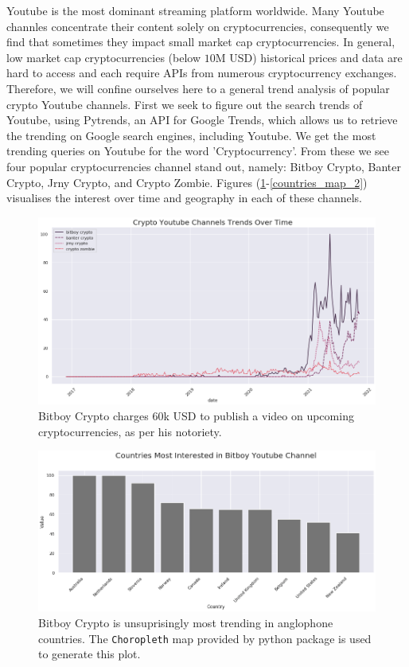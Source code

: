 \documentclass[twoside]{report}
\newcommand{\code}{\texttt}
\begin{document}
\begin{spacing}{1}
Youtube is the most dominant streaming platform worldwide. Many Youtube channles concentrate their content solely on cryptocurrencies, consequently we find that sometimes they impact small market cap cryptocurrencies. In general, low market cap cryptocurrencies (below $10
$M USD) historical prices and data are hard to access and each require APIs from numerous cryptocurrency exchanges. Therefore, we will confine ourselves here to a general trend analysis of popular crypto Youtube channels.
First we seek to figure out the search trends of Youtube, using Pytrends, an API for Google Trends, which allows us to retrieve the trending on Google search engines, including Youtube. We get the most trending queries on Youtube for the word 'Cryptocurrency'. From these we see four popular cryptocurrencies channel stand out, namely: Bitboy Crypto, Banter Crypto, Jrny Crypto, and Crypto Zombie. Figures (\ref{youtube_channel_crypto_trends}-\ref{countries_map_2}) visualises the interest over time and geography in each of these channels.

\begin{figure}[!htbp]
    \centering
    \includegraphics[scale = 0.5]{Images/youtube_channel_crypto_trends.png}
    \caption{Bitboy Crypto charges 60k USD to publish a video on upcoming cryptocurrencies, as per his notoriety.}
    \label{youtube_channel_crypto_trends}
\end{figure}

\begin{figure}[!htbp]
    \centering
    \includegraphics[scale = 0.5]{Images/countries_rank_bitboy_crypto_youtube.png}
    \caption{Bitboy Crypto is unsuprisingly most trending in anglophone countries. The \code{Choropleth} map provided by  python package is used to generate this plot.}
    \label{countries_rank_bitboy_crypto_youtube}
\end{figure}


\end{spacing}
\end{document}

